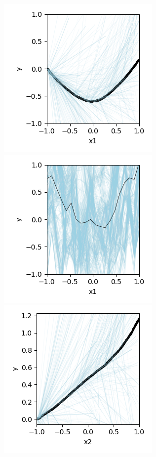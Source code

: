 \documentclass[12pt]{article}
\begin{document}
\begin{figure}[htbp]
\begin{center}
\includegraphics[scale=0.7]{images/add_x1_y_stratpd.png}
\includegraphics[scale=0.7]{images/add_x1_y_pdp.png}
\\
\includegraphics[scale=0.7]{images/add_x2_y_stratpd.png}

\end{center}
\end{figure}
\end{document}
